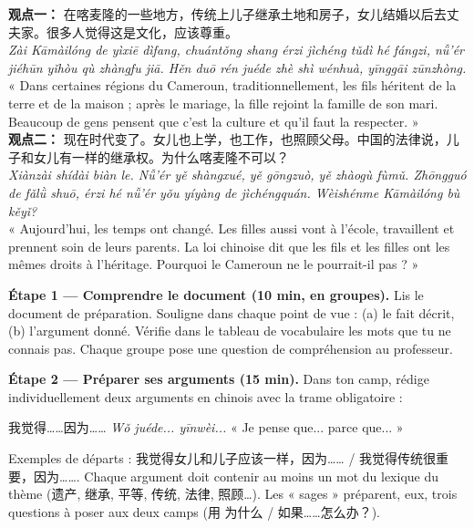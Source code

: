 \documentclass[11pt]{article}
\newcommand{\cle}[1]{{\popxbold\color{popdark}#1}}
\newcounter{popsec}
\newcounter{popsub}
\newcommand{\courssub}[1]{%
  \stepcounter{popsub}%
  \par\vspace{9pt}\noindent{\popxbold\fontsize{11.5}{13}\selectfont\color{popink}{\color{poporange}\thepopsec.\thepopsub}\hspace{6pt}#1}\par\nopagebreak\vspace{4pt}
}
\begin{document}
\begin{textebox}
\textbf{观点一：} 在喀麦隆的一些地方，传统上儿子继承土地和房子，女儿结婚以后去丈夫家。很多人觉得这是文化，应该尊重。\\
\emph{Zài Kāmàilóng de yìxiē dìfang, chuántǒng shang érzi jìchéng tǔdì hé fángzi, nǚ'ér jiéhūn yǐhòu qù zhàngfu jiā. Hěn duō rén juéde zhè shì wénhuà, yīnggāi zūnzhòng.}\\
« Dans certaines régions du Cameroun, traditionnellement, les fils héritent de la terre et de la maison ; après le mariage, la fille rejoint la famille de son mari. Beaucoup de gens pensent que c'est la culture et qu'il faut la respecter. »\\[4pt]
\textbf{观点二：} 现在时代变了。女儿也上学，也工作，也照顾父母。中国的法律说，儿子和女儿有一样的继承权。为什么喀麦隆不可以？\\
\emph{Xiànzài shídài biàn le. Nǚ'ér yě shàngxué, yě gōngzuò, yě zhàogù fùmǔ. Zhōngguó de fǎlǜ shuō, érzi hé nǚ'ér yǒu yíyàng de jìchéngquán. Wèishénme Kāmàilóng bù kěyǐ?}\\
« Aujourd'hui, les temps ont changé. Les filles aussi vont à l'école, travaillent et prennent soin de leurs parents. La loi chinoise dit que les fils et les filles ont les mêmes droits à l'héritage. Pourquoi le Cameroun ne le pourrait-il pas ? »
\end{textebox}

\courssub{Consignes}

\textbf{Étape 1 — Comprendre le document (10 min, en groupes).} Lis le document de préparation. Souligne dans chaque point de vue : (a) le fait décrit, (b) l'argument donné. Vérifie dans le tableau de vocabulaire les mots que tu ne connais pas. Chaque groupe pose une question de compréhension au professeur.

\textbf{Étape 2 — Préparer ses arguments (15 min).} Dans ton camp, rédige individuellement \cle{deux arguments} en chinois avec la trame obligatoire :

\begin{center}
我觉得……因为…… \quad \emph{Wǒ juéde... yīnwèi...} \quad « Je pense que... parce que... »
\end{center}

Exemples de départs : 我觉得女儿和儿子应该一样，因为…… / 我觉得传统很重要，因为……. Chaque argument doit contenir au moins \cle{un mot du lexique du thème} (遗产, 继承, 平等, 传统, 法律, 照顾…). Les « sages » préparent, eux, trois questions à poser aux deux camps (用 为什么 / 如果……怎么办？).
\end{document}
